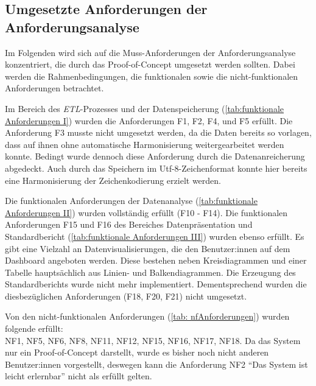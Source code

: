 \subsection{Umgesetzte Anforderungen der Anforderungsanalyse}
Im Folgenden wird sich auf die Muss-Anforderungen der Anforderungsanalyse konzentriert, die durch das Proof-of-Concept
umgesetzt werden sollten. Dabei werden die Rahmenbedingungen, die funktionalen sowie die nicht-funktionalen Anforderungen
betrachtet.

Im Bereich des \textit{\acrshort{ETL}}-Prozesses und der Datenspeicherung (\autoref{tab:funktionale Anforderungen I}) wurden die Anforderungen F1, F2, F4, und F5 erfüllt.
Die Anforderung F3 musste nicht umgesetzt werden, da die Daten bereits so vorlagen, dass auf ihnen ohne automatische Harmonisierung weitergearbeitet werden konnte.
Bedingt wurde dennoch diese Anforderung durch die Datenanreicherung abgedeckt. Auch durch das Speichern im Utf-8-Zeichenformat konnte hier bereits eine Harmonisierung der
Zeichenkodierung erzielt werden.

Die funktionalen Anforderungen der Datenanalyse (\autoref{tab:funktionale Anforderungen II}) wurden vollständig erfüllt (F10 - F14).
Die funktionalen Anforderungen F15 und F16 des Bereiches Datenpräsentation und Standardbericht (\autoref{tab:funktionale Anforderungen III}) 
wurden ebenso erfüllt. Es gibt eine Vielzahl an Datenvisualisierungen, die den Benutzer:innen auf dem Dashboard angeboten werden. 
Diese bestehen neben Kreisdiagrammen und einer Tabelle hauptsächlich aus Linien- und Balkendiagrammen.
Die Erzeugung des Standardberichts wurde nicht mehr implementiert. Dementsprechend wurden die diesbezüglichen
Anforderungen (F18, F20, F21) nicht umgesetzt. 

Von den nicht-funktionalen Anforderungen (\autoref{tab: nfAnforderungen}) wurden folgende erfüllt:\\
NF1, NF5, NF6, NF8, NF11, NF12, NF15, NF16, NF17, NF18. 
Da das System nur ein Proof-of-Concept darstellt, wurde es bisher noch nicht anderen
Benutzer:innen vorgestellt, deswegen kann die Anforderung NF2 \enquote{Das System ist leicht erlernbar} nicht als erfüllt gelten.

